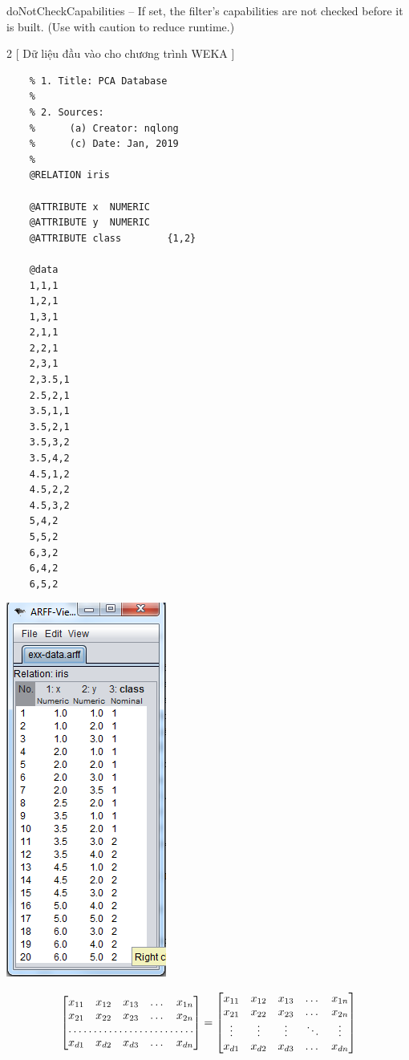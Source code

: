 \documentclass{hcmutarticle}
\begin{document}
doNotCheckCapabilities -- If set, the filter's capabilities are not checked before it is built. (Use with caution to reduce runtime.)


\begin{multicols}{2}
	[
	Dữ liệu đầu vào cho chương trình WEKA
	]
	\begin{lstlisting}
	% 1. Title: PCA Database
	% 
	% 2. Sources:
	%      (a) Creator: nqlong
	%      (c) Date: Jan, 2019
	% 
	@RELATION iris
	
	@ATTRIBUTE x  NUMERIC
	@ATTRIBUTE y  NUMERIC
	@ATTRIBUTE class        {1,2}
	
	@data
	1,1,1
	1,2,1
	1,3,1
	2,1,1
	2,2,1
	2,3,1
	2,3.5,1
	2.5,2,1
	3.5,1,1
	3.5,2,1
	3.5,3,2
	3.5,4,2
	4.5,1,2
	4.5,2,2
	4.5,3,2
	5,4,2
	5,5,2
	6,3,2
	6,4,2
	6,5,2
	\end{lstlisting}
	
	\begin{center}
		\includegraphics[scale=0.7]{image/data_weka.png}
	\end{center}
\end{multicols}

\[
\begin{bmatrix}
x_{11}       & x_{12} & x_{13} & \dots & x_{1n} \\
x_{21}       & x_{22} & x_{23} & \dots & x_{2n} \\
\hdotsfor{5} \\
x_{d1}       & x_{d2} & x_{d3} & \dots & x_{dn}
\end{bmatrix}
=
\begin{bmatrix}
x_{11} & x_{12} & x_{13} & \dots  & x_{1n} \\
x_{21} & x_{22} & x_{23} & \dots  & x_{2n} \\
\vdots & \vdots & \vdots & \ddots & \vdots \\
x_{d1} & x_{d2} & x_{d3} & \dots  & x_{dn}
\end{bmatrix}
\]
\end{document}
